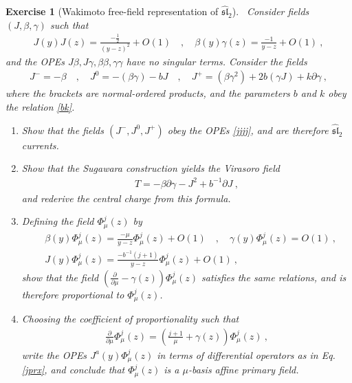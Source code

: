 \documentclass[12pt, a4paper, notitlepage, twoside]{report}
\numberwithin{equation}{section}
\theoremstyle{break}
\newtheorem{exo}{Exercise}[chapter]
\begin{document}
\begin{exo}[Wakimoto free-field representation of $\widehat{\mathfrak{sl}}_2$]
 ~\label{exowaki}
Consider fields $(J,\beta,\gamma)$ such that 
\begin{align}
 J(y)J(z) = \frac{-\frac12}{(y-z)^2} + O(1) \quad , \quad \beta(y)\gamma(z) = \frac{-1}{y-z} + O(1)\ ,
\end{align}
and the OPEs $J\beta,J\gamma,\beta\beta,\gamma\gamma$ have no singular terms.
Consider the fields 
\begin{align}
 J^- = -\beta \quad , \quad J^0 = -(\beta\gamma) - bJ \quad , \quad J^+ = (\beta\gamma^2)+2b(\gamma J)+k\partial\gamma\ ,
\end{align}
where the brackets are normal-ordered products, and the parameters $b$ and $k$ obey the relation \eqref{bk}.

\begin{enumerate}
 \item 
Show that the fields $(J^-,J^0,J^+)$ obey the OPEs \eqref{jjjj}, and are therefore $\widehat{\mathfrak{sl}}_2$ currents. 
\item
Show that the Sugawara construction yields the Virasoro field
\begin{align}
 T = -\beta \partial\gamma - J^2 +b^{-1}\partial J\ ,
\end{align}
and rederive the central charge from this formula.

\item
Defining the field $\Phi^j_\mu(z)$ by 
\begin{align}
 & \beta(y)\Phi^j_\mu(z) = \frac{-\mu}{y-z}\Phi^j_\mu(z)+ O(1) \quad , \quad \gamma(y)\Phi^j_\mu(z)=O(1)\ , 
\\
 & J(y)\Phi^j_\mu(z) = \frac{-b^{-1}(j+1)}{y-z}\Phi^j_\mu(z)+ O(1)\ ,
\end{align}
show that the field $\left({\frac{\partial}{\partial \mu}}-\gamma(z)\right)\Phi^j_\mu(z)$ satisfies the same relations, and is therefore proportional to $\Phi^j_\mu(z)$.

\item
Choosing the coefficient of proportionality such that
\begin{align}
 {\frac{\partial}{\partial \mu}}\Phi^j_\mu(z) =\left(\frac{j+1}{\mu}+\gamma(z)\right)\Phi^j_\mu(z)\ ,
\end{align}
write the OPEs $J^a(y)\Phi^j_\mu(z)$ in terms of differential operators as in Eq. \eqref{jprx}, and conclude that $\Phi^j_\mu(z)$ is a $\mu$-basis affine primary field.
\end{enumerate}
\end{exo}
\end{document}
